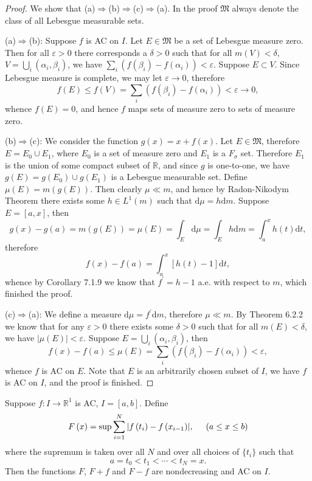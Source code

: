 \begin{proof}
We show that (a)$\Rightarrow$(b)$\Rightarrow$(c)$\Rightarrow$(a). In the proof $\mathfrak{M}$ always denote the class of all Lebesgue measurable sets.\par
(a)$\Rightarrow$(b): Suppose $f$ is AC on $I$. Let $E\in\mathfrak{M}$ be a set of Lebesgue measure zero. Then for all $\varepsilon>0$ there corresponds a $\delta>0$ such that for all $m(V)<\delta$, $V=\bigcup_{i}(\alpha_i,\beta_i)$, we have $\sum_i(f(\beta_i)-f(\alpha_i))<\varepsilon$. Suppose $E\subset V$. Since Lebesgue measure is complete, we may let $\varepsilon\to 0$, therefore 
$$
f\left( E \right) \le f\left( V \right) =\sum_i{\left( f\left( \beta _i \right) -f\left( \alpha _i \right) \right)}<\varepsilon\to 0 ,
$$
whence $f(E)=0$, and hence $f$ maps sets of measure zero to sets of measure zero.\par
(b)$\Rightarrow$(c): We consider the function $g(x)=x+f(x)$. Let $E\in\mathfrak{M}$, therefore $E=E_0\cup E_1$, where $E_0$ is a set of measure zero and $E_1$ is a $F_\sigma$ set. Therefore $E_1$ is the union of some compact subset of $\mathbb{R}$, and since $g$ is one-to-one, we have $g(E)=g(E_0)\cup g(E_1)$ is a Lebesgue measurable set. Define $\mu(E)=m(g(E))$. Then clearly $\mu\ll m$, and hence by Radon-Nikodym Theorem there exists some $h\in L^1(m)$ such that $\mathrm{d}\mu=h\mathrm{d}m$. Suppose $E=[a,x]$, then 
$$
g\left( x \right) -g\left( a \right) =m\left( g\left( E \right) \right) =\mu \left( E \right) =\int_E{\mathrm{d}\mu}=\int_E{h\mathrm{d}m}=\int_a^x{h\left( t \right) \mathrm{d}t},
$$
therefore 
$$
f\left( x \right) -f\left( a \right) =\int_a^x{\left[ h\left( t \right) -1 \right] \mathrm{d}t},
$$
whence by Corollary 7.1.9 we know that $f^\prime=h-1$ a.e. with respect to $m$, which finished the proof.\par
(c)$\Rightarrow$(a): We define a measure $\mathrm{d}\mu=f^\prime\mathrm{d}m$, therefore $\mu\ll m$. By Theorem 6.2.2 we know that for any $\varepsilon>0$ there exists some $\delta>0$ such that for all $m(E)<\delta$, we have $|\mu(E)|<\varepsilon$. Suppose $E=\bigcup_i(\alpha_i,\beta_i)$, then 
$$
f\left( x \right) -f\left( a \right) \le \mu \left( E \right) =\sum_i{\left( f\left( \beta _i \right) -f\left( \alpha _i \right) \right)}<\varepsilon ,
$$
whence $f$ is AC on $E$. Note that $E$ is an arbitrarily chosen subset of $I$, we have $f$ is AC on $I$, and the proof is finished.
\end{proof}
\begin{theorem}
Suppose $f:I\to\mathbb{R}^1$ is AC, $I=[a,b]$. Define 
$$
F\left( x \right) =\mathrm{sup}\sum_{i=1}^N{\left| f\left( t_i \right) -f\left( x_{i-1} \right) \right|},\hspace{0.5cm}\left( a\le x\le b \right) 
$$
where the supremum is taken over all $N$ and over all choices of $\{t_i\}$ such that 
$$
a=t_0<t_1<\cdots <t_N=x.
$$
Then the functions $F$, $F+f$ and $F-f$ are nondecreasing and AC on $I$.
\end{theorem}
